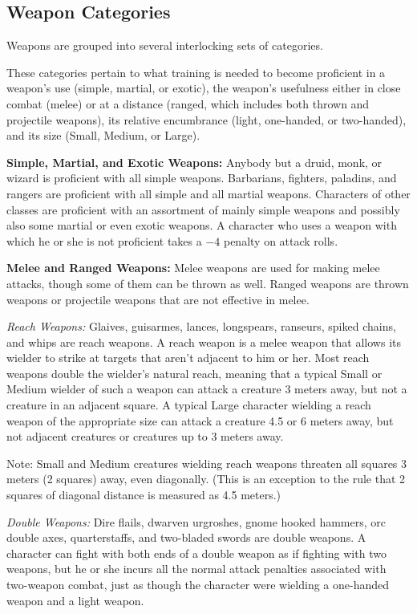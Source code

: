 \subsection{Weapon Categories}
Weapons are grouped into several interlocking sets of categories.

These categories pertain to what training is needed to become proficient in a weapon's use (simple, martial, or exotic), the weapon's usefulness either in close combat (melee) or at a distance (ranged, which includes both thrown and projectile weapons), its relative encumbrance (light, one-handed, or two-handed), and its size (Small, Medium, or Large).

\textbf{Simple, Martial, and Exotic Weapons:} Anybody but a druid, monk, or wizard is proficient with all simple weapons. Barbarians, fighters, paladins, and rangers are proficient with all simple and all martial weapons. Characters of other classes are proficient with an assortment of mainly simple weapons and possibly also some martial or even exotic weapons. A character who uses a weapon with which he or she is not proficient takes a $-4$ penalty on attack rolls.

\textbf{Melee and Ranged Weapons:} Melee weapons are used for making melee attacks, though some of them can be thrown as well. Ranged weapons are thrown weapons or projectile weapons that are not effective in melee.

\textit{Reach Weapons:} Glaives, guisarmes, lances, longspears, ranseurs, spiked chains, and whips are reach weapons. A reach weapon is a melee weapon that allows its wielder to strike at targets that aren't adjacent to him or her. Most reach weapons double the wielder's natural reach, meaning that a typical Small or Medium wielder of such a weapon can attack a creature 3 meters away, but not a creature in an adjacent square. A typical Large character wielding a reach weapon of the appropriate size can attack a creature 4.5 or 6 meters away, but not adjacent creatures or creatures up to 3 meters away.

Note: Small and Medium creatures wielding reach weapons threaten all squares 3 meters (2 squares) away, even diagonally. (This is an exception to the rule that 2 squares of diagonal distance is measured as 4.5 meters.)

\textit{Double Weapons:} Dire flails, dwarven urgroshes, gnome hooked hammers, orc double axes, quarterstaffs, and two-bladed swords are double weapons. A character can fight with both ends of a double weapon as if fighting with two weapons, but he or she incurs all the normal attack penalties associated with two-weapon combat, just as though the character were wielding a one-handed weapon and a light weapon.

